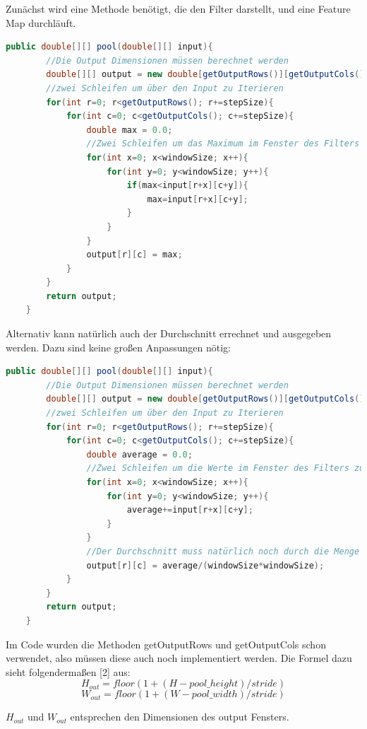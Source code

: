 \documentclass[12pt]{article}
\begin{document}
Zunächst wird eine Methode benötigt, die den Filter darstellt, und eine Feature Map durchläuft. 

\begin{lstlisting}[language=Java]
 public double[][] pool(double[][] input){
 		//Die Output Dimensionen müssen berechnet werden
        double[][] output = new double[getOutputRows()][getOutputCols()];
        //zwei Schleifen um über den Input zu Iterieren
        for(int r=0; r<getOutputRows(); r+=stepSize){
            for(int c=0; c<getOutputCols(); c+=stepSize){
                double max = 0.0;
                //Zwei Schleifen um das Maximum im Fenster des Filters zu finden
                for(int x=0; x<windowSize; x++){
                    for(int y=0; y<windowSize; y++){
                        if(max<input[r+x][c+y]){
                            max=input[r+x][c+y];
                        }
                    }
                }
                output[r][c] = max;
            }
        }
        return output;
    }
\end{lstlisting}
Alternativ kann natürlich auch der Durchschnitt errechnet und ausgegeben werden. Dazu sind keine großen Anpassungen nötig:
\begin{lstlisting}[language=Java]
 public double[][] pool(double[][] input){
 		//Die Output Dimensionen müssen berechnet werden
        double[][] output = new double[getOutputRows()][getOutputCols()];
        //zwei Schleifen um über den Input zu Iterieren
        for(int r=0; r<getOutputRows(); r+=stepSize){
            for(int c=0; c<getOutputCols(); c+=stepSize){
                double average = 0.0;
                //Zwei Schleifen um die Werte im Fenster des Filters zu addieren
                for(int x=0; x<windowSize; x++){
                    for(int y=0; y<windowSize; y++){
                    	average+=input[r+x][c+y];
                    }
                }
                //Der Durchschnitt muss natürlich noch durch die Menge der im Filterfenster enthaltenen Pixel geteilt werden
                output[r][c] = average/(windowSize*windowSize);
            }
        }
        return output;
    }
\end{lstlisting}
Im Code wurden die Methoden getOutputRows und getOutputCols schon verwendet, also müssen diese auch noch implementiert werden. Die Formel dazu sieht folgendermaßen [2] aus:
$$H_{out} = floor(1 + (H - pool\_height)/stride)$$
$$W_{out} = floor(1 + (W - pool\_ width)/stride)$$

$H_{out}$ und $W_{out}$ entsprechen den Dimensionen des output Fensters. 
\end{document}
